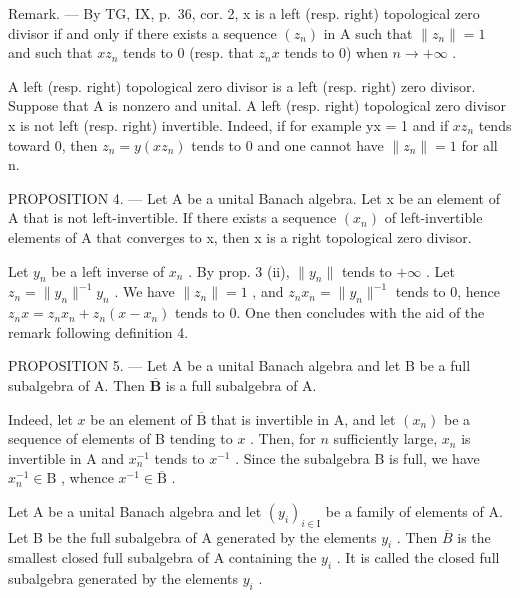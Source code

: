Remark. --- By TG, IX, p.~36, cor. 2, x is a left (resp. right) topological zero divisor if and only if there exists a sequence \((z_{n})\) in A such that \(\|z_{n}\|=1\) and such that \(xz_{n}\) tends to 0 (resp. that \(z_{n}x\) tends to 0) when \(n\to+\infty\) .

A left (resp. right) topological zero divisor is a left (resp. right) zero divisor. Suppose that A is nonzero and unital. A left (resp. right) topological zero divisor x is not left (resp. right) invertible. Indeed, if for example yx = 1 and if \(xz_{n}\) tends toward 0, then \(z_{n} = y(xz_{n})\) tends to 0 and one cannot have \(\|z_{n}\| = 1\) for all n.

PROPOSITION 4. --- Let A be a unital Banach algebra. Let x be an element of A that is not left-invertible. If there exists a sequence \((x_{n})\) of left-invertible elements of A that converges to x, then x is a right topological zero divisor.

Let \(y_{n}\) be a left inverse of \(x_{n}\) . By prop. 3 (ii), \(\|y_{n}\|\) tends to \(+\infty\) . Let \(z_{n} = \|y_{n}\|^{-1}y_{n}\) . We have \(\|z_{n}\| = 1\) , and \(z_{n}x_{n} = \|y_{n}\|^{-1}\) tends to 0, hence \(z_{n}x = z_{n}x_{n} + z_{n}(x - x_{n})\) tends to 0. One then concludes with the aid of the remark following definition 4.

PROPOSITION 5. --- Let A be a unital Banach algebra and let B be a full subalgebra of A. Then \(\overline{\mathbf{B}}\) is a full subalgebra of A.

Indeed, let \(x\) be an element of \(\overline{\mathrm{B}}\) that is invertible in A, and let \((x_n)\) be a sequence of elements of B tending to \(x\) . Then, for \(n\) sufficiently large, \(x_n\) is invertible in A and \(x_n^{-1}\) tends to \(x^{-1}\) . Since the subalgebra B is full, we have \(x_n^{-1} \in \mathrm{B}\) , whence \(x^{-1} \in \overline{\mathrm{B}}\) .

Let A be a unital Banach algebra and let \((y_{i})_{i\in\mathrm{I}}\) be a family of elements of A. Let B be the full subalgebra of A generated by the elements \(y_{i}\) . Then \(\overline{B}\) is the smallest closed full subalgebra of A containing the \(y_{i}\) . It is called the closed full subalgebra generated by the elements \(y_{i}\) .

